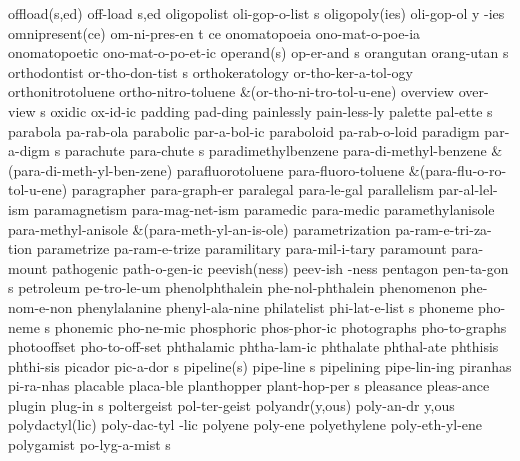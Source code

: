 \2 offload(s,ed)	off-load s,ed		%
\5 oligopolist		oli-gop-o-list s
\3 oligopoly(ies)	oli-gop-ol y -ies
\3 omnipresent(ce)	om-ni-pres-en t ce	%
\NewWordtrue
\1 onomatopoeia		ono-mat-o-poe-ia	%
\NewWordtrue
\1 onomatopoetic	ono-mat-o-po-et-ic	%
\2 operand(s)		op-er-and s
\5 orangutan		orang-utan s
\5 orthodontist 	or-tho-don-tist s
\1 orthokeratology	or-tho-ker-a-tol-ogy
\1 orthonitrotoluene	ortho-nitro-toluene
\tabalign		&\null\quad (or-tho-ni-tro-tol-u-ene)\cr
\5 overview		over-view s
\1 oxidic		ox-id-ic
\1 padding		pad-ding
\1 painlessly		pain-less-ly
\5 palette		pal-ette s		%
\1 parabola		pa-rab-ola
\1 parabolic		par-a-bol-ic
\1 paraboloid		pa-rab-o-loid
\5 paradigm		par-a-digm s
\5 parachute		para-chute s
\1 paradimethylbenzene	para-di-methyl-benzene
\tabalign		&\null\quad (para-di-meth-yl-ben-zene)\cr
\1 parafluorotoluene	para-fluoro-toluene
\tabalign		&\null\quad (para-flu-o-ro-tol-u-ene)\cr
\1 paragrapher		para-graph-er
\1 paralegal		para-le-gal
\1 parallelism		par-al-lel-ism
\1 paramagnetism	para-mag-net-ism
\1 paramedic		para-medic
\1 paramethylanisole	para-methyl-anisole
\tabalign		&\null\quad (para-meth-yl-an-is-ole)\cr
\NewWordtrue
\1 parametrization	pa-ram-e-tri-za-tion	%
\1 parametrize		pa-ram-e-trize
\1 paramilitary 	para-mil-i-tary
\1 paramount		para-mount
\1 pathogenic		path-o-gen-ic
\2 peevish(ness)	peev-ish -ness
\5 pentagon		pen-ta-gon s
\1 petroleum		pe-tro-le-um
\1 phenolphthalein	phe-nol-phthalein	%
\1 phenomenon		phe-nom-e-non
\1 phenylalanine 	phenyl-ala-nine		%
\5 philatelist		phi-lat-e-list s
\5 phoneme		pho-neme s              %
\1 phonemic		pho-ne-mic
\1 phosphoric		phos-phor-ic
\1 photographs		pho-to-graphs        %
\1 photooffset		pho-to-off-set  	%
\1 phthalamic		phtha-lam-ic		%
\1 phthalate		phthal-ate		%
\1 phthisis		phthi-sis		%
\5 picador		pic-a-dor s
\2 pipeline(s)		pipe-line s	%
\1 pipelining		pipe-lin-ing		%
\1 piranhas		pi-ra-nhas
\1 placable		placa-ble
\5 planthopper		plant-hop-per s	%
\1 pleasance		pleas-ance
\5 plugin		plug-in s	%
\1 poltergeist		pol-ter-geist
\2 polyandr(y,ous)	poly-an-dr y,ous	%
\2 polydactyl(lic)	poly-dac-tyl -lic	%
\1 polyene		poly-ene
\1 polyethylene		poly-eth-yl-ene
\5 polygamist		po-lyg-a-mist s

